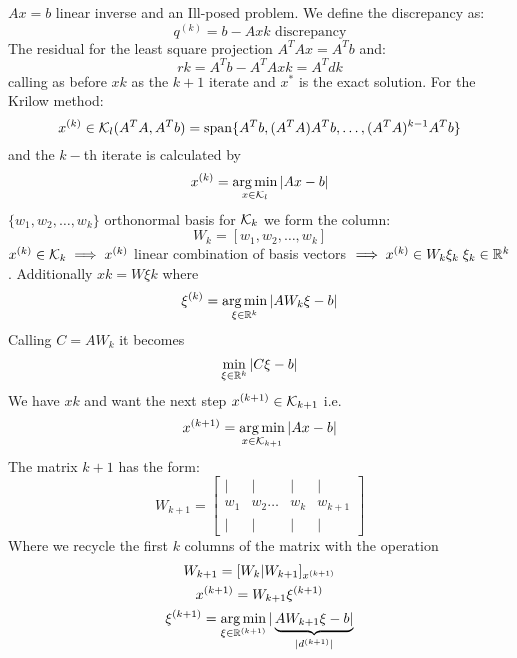
$Ax=b$ linear inverse and an Ill-posed problem. We define the discrepancy as:
$$ q^{(k)} = b-Ax\si{k} \text{ discrepancy}$$
The residual for the least square projection $A^TAx= A^Tb$ and:
$$r\si{k} = A^Tb - A^TAx\si{k} = A^T d\si{k}$$
calling as before $x\si{k}$ as the $k+1$ iterate and $x^*$ is the exact solution. For the Krilow method:
$$x^{(k)} \in \mathbf{\mathcal{K}}_l(A^TA, A^Tb) = \operatorname{span}\{A^Tb, (A^TA)A^Tb, \ldots, (A^TA)^{k-1}A^T b\}$$
and the $k-$th iterate is calculated by
$$x^{(k)} = \operatorname*{arg\,min}_{x\in \mathbf{\mathcal{K}}_l} |Ax-b|$$
$\{w_1,w_2,\ldots, w_k\}$ orthonormal basis for $\mathbf{\mathcal{K}}_k$ we form the column:
$$W_k = [w_1, w_2, \ldots, w_k]$$
$x^{(k)}\in \mathbf{\mathcal{K}}_k \implies x^{(k)}$ linear combination of basis vectors $\implies x^{(k)} \in W_k \xi_k\; \xi_k \in \mathbb{R}^k$. Additionally $x\si{k} = W\xi\si{k}$ where 
$$\xi^{(k)} = \operatorname*{arg\,min}_{\xi\in \mathbb{R}^k} |AW_k \xi - b|$$
Calling $C=AW_k$ it becomes 
$$\min_{\xi\in \mathbb{R}^k} |C\xi - b|$$ 
We have $x\si{k} $ and want the next step $x^{(k+1)}\in \mathbf{\mathcal{K}}_{k+1}$ i.e.
$$x^{(k+1)} = \operatorname*{arg\,min}_{x\in \mathbf{\mathcal{K}}_{k+1}} |Ax-b|$$
The matrix $k+1$ has the form:
$$W_{k+1} = \begin{bmatrix} | & | \phantom{\ldots} & | & | \\
                           w_1&w_2  \ldots         &w_k&w_{k+1}\\
 | & | \phantom{\ldots} & | & | \end{bmatrix}$$
Where we recycle the first $k$ columns of the matrix with the operation
\begin{gather*}
W_{k+1} = [W_k | W_{k+1}] _{x^{(k+1)}}\\
x^{(k+1)} = W_{k+1} \xi^{(k+1)}\\
\xi^{(k+1)} = \operatorname*{arg\,min}_{\xi\in \mathbb{R}^{(k+1)}} |\underbrace{AW_{k+1} \xi - b|}_{|d^{(k+1)}|}
\end{gather*}
